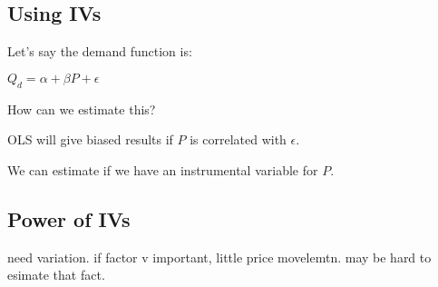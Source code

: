 
\subsection{Using IVs}

Let's say the demand function is:

\(Q_d=\alpha+\beta P + \epsilon \)

How can we estimate this?

OLS will give biased results if \(P\) is correlated with \(\epsilon \).

We can estimate if we have an instrumental variable for \(P\). 

\subsection{Power of IVs}

need variation. if factor v important, little price movelemtn. may be hard to esimate that fact.

